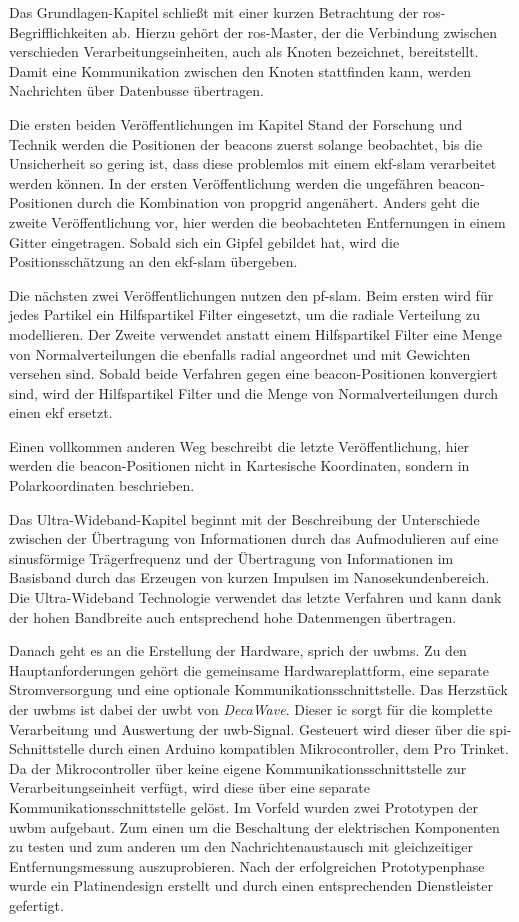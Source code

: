 Das Grundlagen-Kapitel schließt mit einer kurzen Betrachtung der \gls{ros}-Begrifflichkeiten ab. Hierzu gehört der \gls{ros}-Master, der die Verbindung zwischen verschieden Verarbeitungseinheiten, auch als Knoten bezeichnet, bereitstellt. Damit eine Kommunikation zwischen den Knoten stattfinden kann, werden Nachrichten über Datenbusse übertragen.

Die ersten beiden Veröffentlichungen im Kapitel Stand der Forschung und Technik werden die Positionen der \glspl{beacon} zuerst solange beobachtet, bis die Unsicherheit so gering ist, dass diese problemlos mit einem \gls{ekf}-\gls{slam} verarbeitet werden können. In der ersten Veröffentlichung werden die ungefähren \gls{beacon}-Positionen durch die Kombination von \gls{propgrid} angenähert. Anders geht die zweite Veröffentlichung vor, hier werden die beobachteten Entfernungen in einem Gitter eingetragen. Sobald sich ein Gipfel gebildet hat, wird die Positionsschätzung an den \gls{ekf}-\gls{slam} übergeben.

Die nächsten zwei Veröffentlichungen nutzen den \gls{pf}-\gls{slam}. Beim ersten wird für jedes Partikel ein Hilfspartikel Filter eingesetzt, um die radiale Verteilung zu modellieren. Der Zweite verwendet anstatt einem Hilfspartikel Filter eine Menge von Normalverteilungen die ebenfalls radial angeordnet und mit Gewichten versehen sind. Sobald beide Verfahren gegen eine \gls{beacon}-Positionen konvergiert sind, wird der Hilfspartikel Filter und die Menge von Normalverteilungen durch einen \gls{ekf} ersetzt.

Einen vollkommen anderen Weg beschreibt die letzte Veröffentlichung, hier werden die \gls{beacon}-Positionen nicht in Kartesische Koordinaten, sondern in Polarkoordinaten beschrieben.

Das Ultra-Wideband-Kapitel beginnt mit der Beschreibung der Unterschiede zwischen der Übertragung von Informationen durch das Aufmodulieren auf eine sinusförmige Trägerfrequenz und der Übertragung von Informationen im Basisband durch das Erzeugen von kurzen Impulsen im Nanosekundenbereich. Die Ultra-Wideband Technologie verwendet das letzte Verfahren und kann dank der hohen Bandbreite auch entsprechend hohe Datenmengen übertragen.

Danach geht es an die Erstellung der Hardware, sprich der \glspl{uwbm}. Zu den Hauptanforderungen gehört die gemeinsame Hardwareplattform, eine separate Stromversorgung und eine optionale Kommunikationsschnittstelle. Das Herzstück der \glspl{uwbm} ist dabei der \gls{uwbt} von \textit{DecaWave}. Dieser \gls{ic} sorgt für die komplette Verarbeitung und Auswertung der \gls{uwb}-Signal. Gesteuert wird dieser über die \gls{spi}-Schnittstelle durch einen Arduino kompatiblen Mikrocontroller, dem Pro Trinket. Da der Mikrocontroller über keine eigene Kommunikationsschnittstelle zur Verarbeitungseinheit verfügt, wird diese über eine separate Kommunikationsschnittstelle gelöst. Im Vorfeld wurden zwei Prototypen der \gls{uwbm} aufgebaut. Zum einen um die Beschaltung der elektrischen Komponenten zu testen und zum anderen um den Nachrichtenaustausch mit gleichzeitiger Entfernungsmessung auszuprobieren. Nach der erfolgreichen Prototypenphase wurde ein Platinendesign erstellt und durch einen entsprechenden Dienstleister gefertigt.

